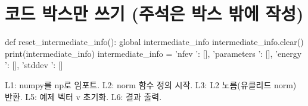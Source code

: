 \documentclass[12pt]{article}
\begin{document}
\section{코드 박스만 쓰기 (주석은 박스 밖에 작성)}

\begin{CodeBox}[title={Example: Python snippet}]
def reset_intermediate_info():
    global intermediate_info
    intermediate_info.clear()
    print(intermediate_info)
    intermediate_info = {
        'nfev ': [],
        'parameters ': [],
        'energy ': [],
        'stddev ': []
    }
\end{CodeBox}

L1: numpy를 np로 임포트.  
L2: norm 함수 정의 시작.  
L3: L2 노름(유클리드 norm) 반환.  
L5: 예제 벡터 v 초기화.  
L6: 결과 출력.
\end{document}

